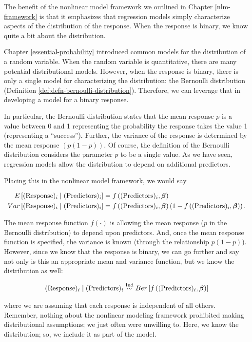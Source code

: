 \documentclass[
]{book}
\theoremstyle{plain}
\theoremstyle{mydefn}
\theoremstyle{myexmpl}
\theoremstyle{remark}
\begin{document}
The benefit of the nonlinear model framework we outlined in Chapter \ref{nlm-framework} is that it emphasizes that regression models simply characterize aspects of the distribution of the response. When the response is binary, we know quite a bit about the distribution.

Chapter \ref{essential-probability} introduced common models for the distribution of a random variable. When the random variable is quantitative, there are many potential distributional models. However, when the response is binary, there is only a single model for characterizing the distribution: the Bernoulli distribution (Definition \ref{def:defn-bernoulli-distribution}). Therefore, we can leverage that in developing a model for a binary response.

In particular, the Bernoulli distribution states that the mean response \(p\) is a value between 0 and 1 representing the probability the response takes the value 1 (representing a ``success''). Further, the variance of the response is determined by the mean response \((p (1 - p))\). Of course, the definition of the Bernoulli distribution considers the parameter \(p\) to be a single value. As we have seen, regression models allow the distribution to depend on additional predictors.

Placing this in the nonlinear model framework, we would say

\[
\begin{aligned}
  E\left[(\text{Response})_i \mid (\text{Predictors})_i\right] 
    &= f\left((\text{Predictors})_i, \boldsymbol{\beta}\right) \\
  Var\left[(\text{Response})_i \mid (\text{Predictors})_i\right]
    &= f\left((\text{Predictors})_i, \boldsymbol{\beta}\right) \left(1 - f\left((\text{Predictors})_i, \boldsymbol{\beta}\right)\right).
\end{aligned}
\]

The mean response function \(f(\cdot)\) is allowing the mean response (\(p\) in the Bernoulli distribution) to depend upon predictors. And, once the mean response function is specified, the variance is known (through the relationship \(p (1 - p)\)). However, since we know that the response is binary, we can go further and say not only is this an appropriate mean and variance function, but we know the distribution as well:

\[(\text{Response})_i \mid (\text{Predictors})_i \stackrel{\text{Ind}}{\sim} Ber\left[f\left((\text{Predictors})_i, \boldsymbol{\beta}\right)\right]\]

where we are assuming that each response is independent of all others. Remember, nothing about the nonlinear modeling framework prohibited making distributional assumptions; we just often were unwilling to. Here, we know the distribution; so, we include it as part of the model.
\end{document}
